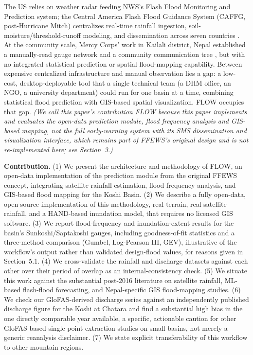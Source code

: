 \documentclass[11pt]{article}
\begin{document}
The US relies on weather radar feeding NWS's Flash Flood Monitoring and Prediction system; the Central America Flash Flood Guidance System (CAFFG, post-Hurricane Mitch) centralizes real-time rainfall ingestion, soil-moisture/threshold-runoff modeling, and dissemination across seven countries \citep{gourley2022}. At the community scale, Mercy Corps' work in Kailali district, Nepal established a manually-read gauge network and a community communication tree \citep{smith2017communitybased}, but with no integrated statistical prediction or spatial flood-mapping capability. Between expensive centralized infrastructure and manual observation lies a gap: a low-cost, desktop-deployable tool that a single technical team (a DHM office, an NGO, a university department) could run for one basin at a time, combining statistical flood prediction with GIS-based spatial visualization. FLOW occupies that gap. \emph{(We call this paper's contribution FLOW because this paper implements and evaluates the open-data prediction module, flood frequency analysis and GIS-based mapping, not the full early-warning system with its SMS dissemination and visualization interface, which remains part of FFEWS's original design and is not re-implemented here; see Section~3.)}

\textbf{Contribution.} (1) We present the architecture and methodology of FLOW, an open-data implementation of the prediction module from the original FFEWS concept, integrating satellite rainfall estimation, flood frequency analysis, and GIS-based flood mapping for the Koshi Basin. (2) We describe a fully open-data, open-source implementation of this methodology, real terrain, real satellite rainfall, and a HAND-based inundation model, that requires no licensed GIS software. (3) We report flood-frequency and inundation-extent results for the basin's Sunkoshi/Saptakoshi gauges, including goodness-of-fit statistics and a three-method comparison (Gumbel, Log-Pearson III, GEV), illustrative of the workflow's output rather than validated design-flood values, for reasons given in Section~5.1. (4) We cross-validate the rainfall and discharge datasets against each other over their period of overlap as an internal-consistency check. (5) We situate this work against the substantial post-2016 literature on satellite rainfall, ML-based flash-flood forecasting, and Nepal-specific GIS flood-mapping studies. (6) We check our GloFAS-derived discharge series against an independently published discharge figure for the Koshi at Chatara and find a substantial high bias in the one directly comparable year available, a specific, actionable caution for other GloFAS-based single-point-extraction studies on small basins, not merely a generic reanalysis disclaimer. (7) We state explicit transferability of this workflow to other mountain regions.
\end{document}
